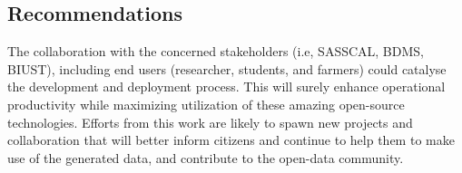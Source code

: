 \documentclass[a4paper, 10pt, conference]{ieeeconf}      %
\begin{document}
\subsection{\textbf{Recommendations}}
\noindent
The collaboration with the concerned   stakeholders (i.e, SASSCAL, BDMS, BIUST), including end users (researcher, students, and  farmers) could catalyse the development and deployment process.
  This will surely enhance operational productivity while  maximizing  utilization of these amazing open-source technologies.
Efforts from this work are  likely to spawn new projects and collaboration that will better inform citizens and continue to help them to make use of the generated data, and  contribute to the open-data community.
	 

\end{document}
